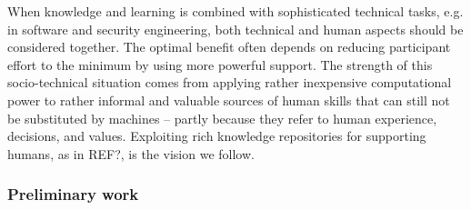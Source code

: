 When knowledge and learning is combined with sophisticated technical tasks, e.g. in software and security engineering, both technical and human aspects should be considered together. The optimal benefit often depends on reducing participant effort to the minimum by using more powerful support. The strength of this socio-technical situation comes from applying rather inexpensive computational power to rather informal and valuable sources of human skills that can still not be substituted by machines – partly because they refer to human experience, decisions, and values. Exploiting rich knowledge repositories for supporting humans, as in REF?, is the vision we follow.

\vspace{-0.5em}
\subsubsection*{Preliminary work}
\label{sec:preliminary_work}
\vspace{-1em}
